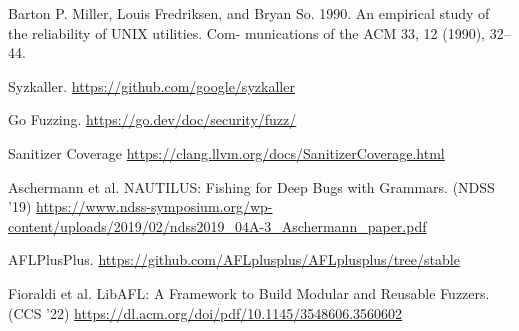 \documentclass[letterpaper,11pt]{article}
\begin{document}
\noindent [1] Barton P. Miller, Louis Fredriksen, and Bryan So. 1990. An empirical study of the reliability of UNIX utilities. Com- munications of the ACM 33, 12 (1990), 32–44.


\noindent [2] Syzkaller. \url{https://github.com/google/syzkaller}

\noindent [3] Go Fuzzing. \url{https://go.dev/doc/security/fuzz/}

\noindent [4] Sanitizer Coverage \url{https://clang.llvm.org/docs/SanitizerCoverage.html}

\noindent [5] Aschermann et al. NAUTILUS: Fishing for Deep Bugs with Grammars. (NDSS '19) \url{https://www.ndss-symposium.org/wp-content/uploads/2019/02/ndss2019_04A-3_Aschermann_paper.pdf}

\noindent [6] AFLPlusPlus. \url{https://github.com/AFLplusplus/AFLplusplus/tree/stable}

\noindent [7] Fioraldi et al. LibAFL: A Framework to Build  Modular and Reusable Fuzzers. (CCS '22) \url{https://dl.acm.org/doi/pdf/10.1145/3548606.3560602}

%
%
\end{document}
